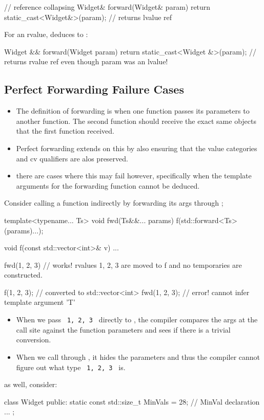 \begin{cppcode}
\begin{cppcode}
//  reference collapsing
Widget& forward(Widget& param) {
  return static_cast<Widget&>(param);
} // returns lvalue ref
\end{cppcode}
For an rvalue,  deduces to :
\begin{cppcode}
Widget && forward(Widget param) {
  return static_cast<Widget &>(param);
} // returns rvalue ref even though param was an lvalue!
\end{cppcode}

\subsection{Perfect Forwarding Failure Cases}
\begin{itemize}
  \item The definition of forwarding is when one function passes its parameters to another function. The second function should receive the exact same objects that the first function received.
  \item Perfect forwarding extends on this by also ensuring that the value categories and cv qualifiers are alos preserved.
  \item there are cases where this may fail however, specifically when the template arguments for the forwarding function cannot be deduced.
\end{itemize}
Consider calling a function  indirectly by forwarding its args through ;
\begin{cppcode}
template<typename... Ts>
void fwd(Ts&&... params) {
  f(std::forward<Ts>(params)...);
}

void f(const std::vector<int>& v) {
  ...
}

fwd(1, 2, 3) // works! rvalues 1, 2, 3 are moved to f and no temporaries are constructed.

f({1, 2, 3}); // converted to std::vector<int>
fwd({1, 2, 3}); // error! cannot infer template argument 'T'
\end{cppcode}
\begin{itemize}
  \item When we pass \texttt{ {1, 2, 3} } directly to , the compiler compares the args at the call site against the function parameters and sees if there is a trivial conversion.
  \item When we call  through , it hides the parameters and thus the compiler cannot figure out what type \texttt{ {1, 2, 3} } is.
\end{itemize}
as well, consider:
\begin{cppcode}
class Widget {
public:
  static const std::size_t MinVals = 28; // MinVal declaration
  ...
};


\end{cppcode}
\end{cppcode}
